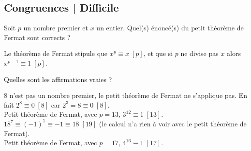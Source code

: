 \subsection{Congruences | Difficile}

\begin{question}
    Soit $p$ un nombre premier et $x$ un entier.
    Quel(s) énoncé(s) du petit théorème de Fermat sont corrects ?
    \begin{answers} 
    \end{answers}
    \begin{explanations} 
    Le théorème de Fermat stipule que $x^p \equiv x \;[p]$, et que si $p$ ne divise pas $x$ alors $x^{p-1} \equiv 1 \;[p]$.
    \end{explanations}
\end{question}


\begin{question}
    Quelles sont les affirmations vraies ?
    \begin{answers} 
    \end{answers}
    \begin{explanations}
    $8$ n'est pas un nombre premier, le petit théorème de Fermat ne s'applique pas. En fait $2^8 \equiv 0 \;[8]$ car $2^3 = 8 \equiv 0 \;[8]$. \\ 
    Petit théorème de Fermat, avec $p=13$,  $3^{12} \equiv 1 \;[13]$. \\
    $18^7 \equiv (-1)^7 \equiv -1  \equiv 18 \; [19]$ (le calcul n'a rien à voir avec le petit théorème de Fermat). \\
    Petit théorème de Fermat, avec $p=17$,  $4^{16} \equiv 1 \; [17]$.
    \end{explanations}
\end{question}


